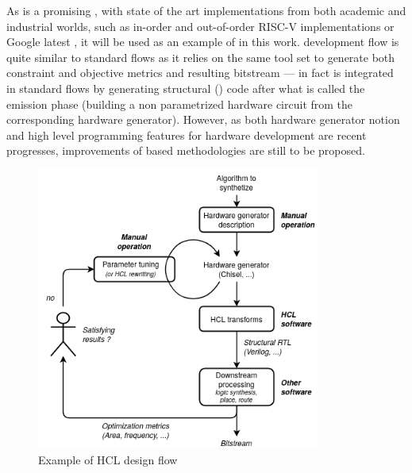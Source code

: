         As \chisel{} is a promising , with state of the art implementations from both academic and industrial worlds, such as in-order and out-of-order RISC-V implementations \cite{celio_berkeley_2015} \cite{asanovic_rocket_2016} or Google latest  \cite{google_tpu_2018}, it will be used as an example of  in this work.
        \chisel{} development flow is quite similar to standard  flows as it relies on the same tool set to generate both constraint and objective metrics and resulting bitstream --- in fact \chisel{} is integrated in standard  flows by generating structural  () code after what is called the emission phase (\ie building a non parametrized hardware circuit from the corresponding hardware generator).
        However, as both hardware generator notion and high level programming features for hardware development are recent progresses, improvements of  based methodologies are still to be proposed.

\clearpage
        \begin{figure}[h!]
            \centering
            \includegraphics[width=0.83\textwidth]{Figures/HCL-flow.png}
            \caption{Example of HCL design flow}
            \label{ch.problem:sec.hardware:ssec.paradigms:fig.hcl}
        \end{figure}

